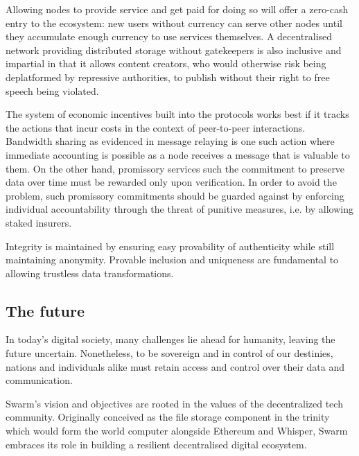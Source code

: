 Allowing nodes to provide service and get paid for doing so will offer a zero-cash entry to the ecosystem: new users without currency can serve other nodes until they accumulate enough currency to use services themselves. A decentralised network providing distributed storage without gatekeepers is also inclusive and impartial in that it allows content creators, who would otherwise risk being deplatformed by repressive  authorities, to publish without their right to free speech being violated. 

The system of economic incentives built into the protocols works best if it tracks the actions that incur costs in the context of peer-to-peer interactions. Bandwidth sharing as evidenced in message relaying is one such action where immediate accounting is possible as a node receives a message that is valuable to them. On the other hand, promissory services such the commitment to preserve data over time must be rewarded only upon verification. In order to avoid the  problem, such promissory commitments should be guarded against by enforcing individual accountability through the threat of punitive measures, i.e. by allowing staked insurers.

Integrity is maintained by ensuring easy provability of authenticity while still maintaining anonymity.
Provable inclusion and uniqueness are fundamental to allowing trustless data transformations.


\subsection{The future} \label{sec:future}

In today's digital society, many challenges lie ahead for humanity, leaving the future uncertain. Nonetheless, to be sovereign and in control of our destinies, nations and individuals alike must retain access and control over their data and communication.

Swarm's vision and objectives are rooted in the values of the decentralized tech community. Originally conceived as the file storage component in the trinity which would form the world computer alongside Ethereum and Whisper, Swarm embraces its role in building a resilient decentralised digital ecosystem.

